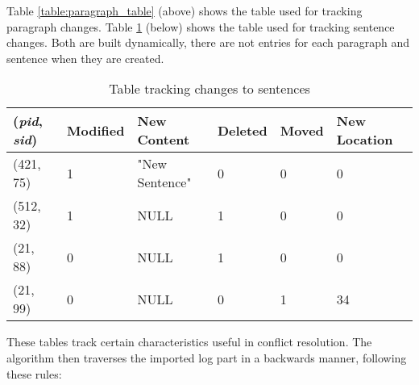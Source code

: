 Table \ref{table:paragraph_table} (above) shows the table used for tracking paragraph
changes. Table \ref{table:sentence_table} (below) shows the table used for tracking
sentence changes. Both are built dynamically, there are not entries for each paragraph
and sentence when they are created. 

\begin{table}[h!]
\begin{center}
 \begin{tabular} {|l|l|l|l|l|l|}
  \hline
   (\emph{pid}, \emph{sid}) & Modified & New Content & Deleted & Moved & New Location \\
  \hline \hline
    (421, 75) & 1 & "New Sentence" & 0 & 0 & 0 \\
   \hline
    (512, 32) & 1 & NULL & 1 & 0 & 0 \\
   \hline
    (21, 88) & 0 & NULL & 1 & 0 & 0 \\
   \hline
    (21, 99) & 0 & NULL & 0 & 1 & 34 \\
   \hline
 \end{tabular}
\end{center}
\caption{Table tracking changes to sentences}
\label{table:sentence_table}
\end{table}

These tables track certain characteristics useful in conflict resolution. The algorithm
then traverses the imported log part in a backwards manner, following these rules:

